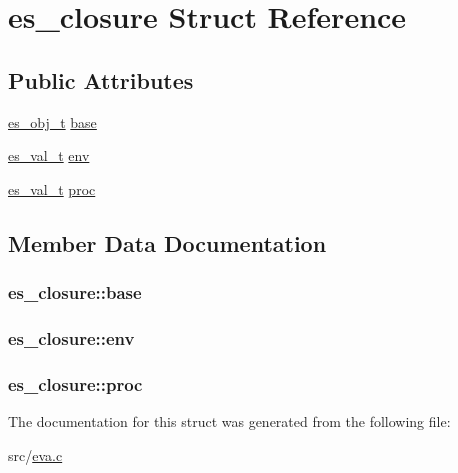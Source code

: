 \hypertarget{structes__closure}{\section{es\-\_\-closure Struct Reference}
\label{structes__closure}
}
\subsection*{Public Attributes}
\begin{DoxyCompactItemize}
\item 
\hyperlink{eva_8h_a3370a89a85f5ff467ca5e7dba47e63bc}{es\-\_\-obj\-\_\-t} \hyperlink{structes__closure_acfa06d85a50ff5498b76fa98bab028e8}{base}
\item 
\hyperlink{eva_8h_a31286b308f3660f383b567314be88045}{es\-\_\-val\-\_\-t} \hyperlink{structes__closure_a02906bd971caf148709eaefb19695e25}{env}
\item 
\hyperlink{eva_8h_a31286b308f3660f383b567314be88045}{es\-\_\-val\-\_\-t} \hyperlink{structes__closure_a68929265d82d81c75caae21ce5d8559a}{proc}
\end{DoxyCompactItemize}


\subsection{Member Data Documentation}
\hypertarget{structes__closure_acfa06d85a50ff5498b76fa98bab028e8}{
\subsubsection[{base}]{ es\-\_\-closure\-::base}}\label{structes__closure_acfa06d85a50ff5498b76fa98bab028e8}
\hypertarget{structes__closure_a02906bd971caf148709eaefb19695e25}{
\subsubsection[{env}]{ es\-\_\-closure\-::env}}\label{structes__closure_a02906bd971caf148709eaefb19695e25}
\hypertarget{structes__closure_a68929265d82d81c75caae21ce5d8559a}{
\subsubsection[{proc}]{ es\-\_\-closure\-::proc}}\label{structes__closure_a68929265d82d81c75caae21ce5d8559a}


The documentation for this struct was generated from the following file\-:\begin{DoxyCompactItemize}
\item 
src/\hyperlink{eva_8c}{eva.\-c}\end{DoxyCompactItemize}
